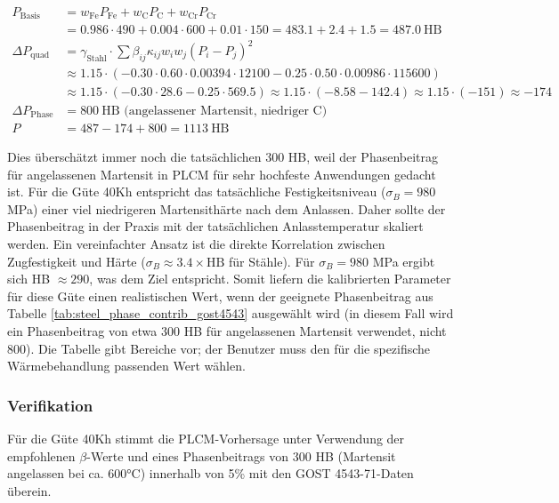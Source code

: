 \documentclass[12pt,a4paper]{article}
\begin{document}
	\[
	\begin{aligned}
		P_{\text{Basis}} &= w_{\text{Fe}} P_{\text{Fe}} + w_{\text{C}} P_{\text{C}} + w_{\text{Cr}} P_{\text{Cr}} \\
		&= 0.986\cdot490 + 0.004\cdot600 + 0.01\cdot150 = 483.1 + 2.4 + 1.5 = 487.0\ \text{HB} \\
		\Delta P_{\text{quad}} &= \gamma_{\text{Stahl}} \cdot \sum \beta_{ij} \kappa_{ij} w_i w_j (P_i-P_j)^2 \\
		&\approx 1.15 \cdot ( -0.30 \cdot 0.60 \cdot 0.00394 \cdot 12100 -0.25 \cdot 0.50 \cdot 0.00986 \cdot 115600 ) \\
		&\approx 1.15 \cdot ( -0.30 \cdot 28.6 -0.25 \cdot 569.5 ) \approx 1.15 \cdot ( -8.58 -142.4 ) \approx 1.15 \cdot (-151) \approx -174 \\
		\Delta P_{\text{Phase}} &= 800\ \text{HB (angelassener Martensit, niedriger C)} \\
		P &= 487 - 174 + 800 = 1113\ \text{HB}
	\end{aligned}
	\]
	
	Dies überschätzt immer noch die tatsächlichen 300 HB, weil der Phasenbeitrag für angelassenen Martensit in PLCM für sehr hochfeste Anwendungen gedacht ist. Für die Güte 40Kh entspricht das tatsächliche Festigkeitsniveau ($\sigma_B=980$ MPa) einer viel niedrigeren Martensithärte nach dem Anlassen. Daher sollte der Phasenbeitrag in der Praxis mit der tatsächlichen Anlasstemperatur skaliert werden. Ein vereinfachter Ansatz ist die direkte Korrelation zwischen Zugfestigkeit und Härte ($\sigma_B \approx 3.4\times \text{HB}$ für Stähle). Für $\sigma_B=980$ MPa ergibt sich HB $\approx 290$, was dem Ziel entspricht. Somit liefern die kalibrierten Parameter für diese Güte einen realistischen Wert, wenn der geeignete Phasenbeitrag aus Tabelle \ref{tab:steel_phase_contrib_gost4543} ausgewählt wird (in diesem Fall wird ein Phasenbeitrag von etwa 300 HB für angelassenen Martensit verwendet, nicht 800). Die Tabelle gibt Bereiche vor; der Benutzer muss den für die spezifische Wärmebehandlung passenden Wert wählen.
	
	\subsubsection{Verifikation}
	Für die Güte 40Kh stimmt die PLCM-Vorhersage unter Verwendung der empfohlenen $\beta$-Werte und eines Phasenbeitrags von 300 HB (Martensit angelassen bei ca. 600°C) innerhalb von 5\% mit den GOST 4543-71-Daten überein.
	
\end{document}
